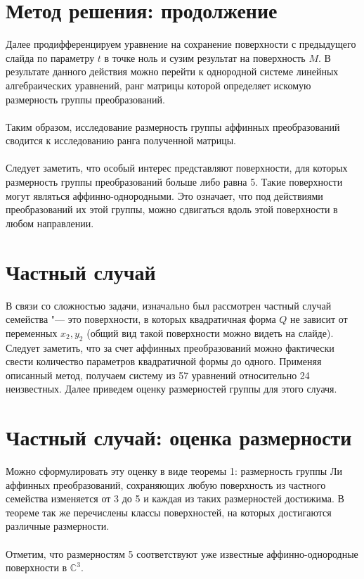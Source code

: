 \documentclass[a4paper,14pt]{extarticle}
\begin{document}
\section{Метод решения: продолжение}
Далее продифференцируем уравнение на сохранение поверхности с предыдущего слайда по параметру $t$ в точке ноль и сузим результат на поверхность $M$. В результате данного действия можно перейти к однородной системе линейных алгебраических уравнений, ранг матрицы которой определяет искомую размерность группы преобразований.
\\~\\
Таким образом, исследование размерность группы аффинных преобразований сводится к исследованию ранга полученной матрицы.
\\~\\
Следует заметить, что особый интерес представляют поверхности, для которых размерность группы преобразований больше либо равна 5. Такие поверхности могут являться аффинно-однородными. Это означает, что под действиями преобразований их этой группы, можно сдвигаться вдоль этой поверхности в любом направлении.

\section{Частный случай}
В связи со сложностью задачи, изначально был рассмотрен частный случай семейства "--- это поверхности, в которых квадратичная форма $Q$ не зависит от переменных $x_2, y_2$ (общий вид такой поверхности можно видеть на слайде). Следует заметить, что за счет аффинных преобразований можно фактически свести количество параметров квадратичной формы до одного. Применяя описанный метод, получаем систему из 57 уравнений относительно 24 неизвестных. Далее приведем оценку размерностей группы для этого слуачя.

\section{Частный случай: оценка размерности}
Можно сформулировать эту оценку в виде теоремы 1: размерность группы Ли аффинных преобразований, сохраняющих любую поверхность из частного семейства изменяется от 3 до 5 и каждая из таких размерностей достижима. В теореме так же перечислены классы поверхностей, на которых достигаются различные размерности.
\\~\\
Отметим, что размерностям 5 соответствуют уже известные аффинно-однородные поверхности в $\mathbb{C}^3$.
\end{document}
